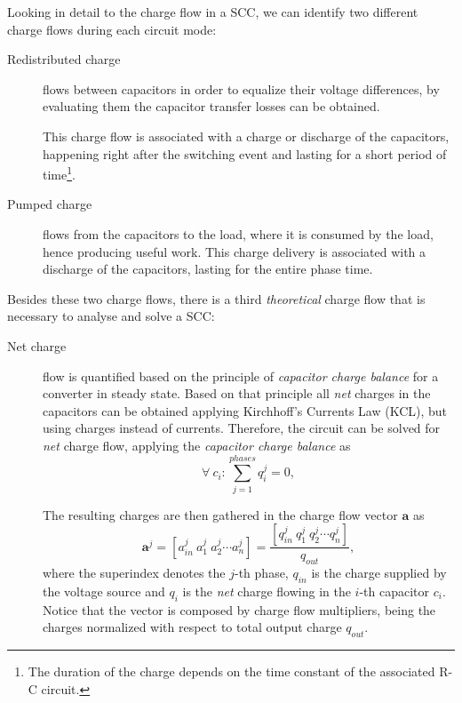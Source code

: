 Looking in detail to the charge flow in a SCC, we can identify two different charge flows during each circuit mode:
\begin{description}

  \item[Redistributed charge] flows between capacitors in order to equalize their voltage differences, by evaluating them the capacitor transfer losses can be obtained.

      This charge flow is associated with a charge or discharge of the capacitors, happening right after the switching event and lasting for a short period of time\footnote{The duration of the charge depends on the time constant of the associated R-C circuit.}.

  \item[Pumped charge] flows from the capacitors to the load, where it is consumed by the load, hence producing useful work.  This charge delivery is associated with a discharge of the capacitors, lasting for the entire phase time.

\end{description}
Besides these two charge flows, there is a third \emph{theoretical} charge flow that is necessary to analyse and solve a SCC:
\begin{description}
  \item[Net charge] flow is quantified based on the principle of \emph{capacitor charge balance} for a converter in steady state. Based on that principle all \emph{net} charges in the capacitors can be obtained applying Kirchhoff's Currents Law (KCL), but using charges instead of currents. Therefore, the circuit can be solved for \emph{net} charge flow, applying the \emph{capacitor charge balance} as
      \begin{equation}
       \forall~c_{i} : \sum_{j=1}^{phases}q_{i}^j = 0,
      \label{eq:charge_balance}
      \end{equation}

     The resulting charges are then gathered in the charge flow vector $\mathbf{a}$ as
       \begin{equation}
        \mathbf{a}^j =  \left[ a_{in}^j~a_1^j~a_2^j \cdots a_n^j \right] = \frac{\left[ q_{in}^j~q_1^j~q_2^j \cdots q_n^j \right]}{q_{out}},
      \label{eq:a_vector}
      \end{equation}
    where the superindex denotes the $j$-th phase, $q_{in}$ is the charge supplied by the voltage source and $q_i$ is the \emph{net} charge flowing in the $i$-th capacitor $c_i$. Notice that the vector is composed by charge flow multipliers, being the charges  normalized with respect to total output charge $q_{out}$.
\end{description}

